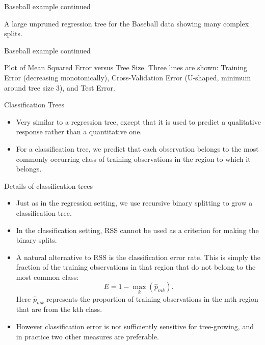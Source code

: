 \documentclass[aspectratio=169, 11pt]{beamer}
\begin{document}
\begin{frame}{Baseball example continued}
\begin{tcolorbox}[colback=LightGray,title=Figure]
A large unpruned regression tree for the Baseball data showing many complex splits.
\end{tcolorbox}
\end{frame}

\begin{frame}{Baseball example continued}
\begin{tcolorbox}[colback=LightGray,title=Figure]
Plot of Mean Squared Error versus Tree Size. Three lines are shown: Training Error (decreasing monotonically), Cross-Validation Error (U-shaped, minimum around tree size 3), and Test Error.
\end{tcolorbox}
\end{frame}

\begin{frame}{Classification Trees}
\begin{itemize}
    \item Very similar to a regression tree, except that it is used to predict a qualitative response rather than a quantitative one.
    \item For a classification tree, we predict that each observation belongs to the most commonly occurring class of training observations in the region to which it belongs.
\end{itemize}
\end{frame}

\begin{frame}{Details of classification trees}
\begin{itemize}
    \item Just as in the regression setting, we use recursive binary splitting to grow a classification tree.
    \item In the classification setting, RSS cannot be used as a criterion for making the binary splits.
    \item A natural alternative to RSS is the classification error rate. This is simply the fraction of the training observations in that region that do not belong to the most common class:
    \begin{equation*}
    E=1-\max_{k}(\hat{p}_{mk}).
    \end{equation*}
    Here $\hat{p}_{mk}$ represents the proportion of training observations in the mth region that are from the kth class.
    \item However classification error is not sufficiently sensitive for tree-growing, and in practice two other measures are preferable.
\end{itemize}
\end{frame}
\end{document}
